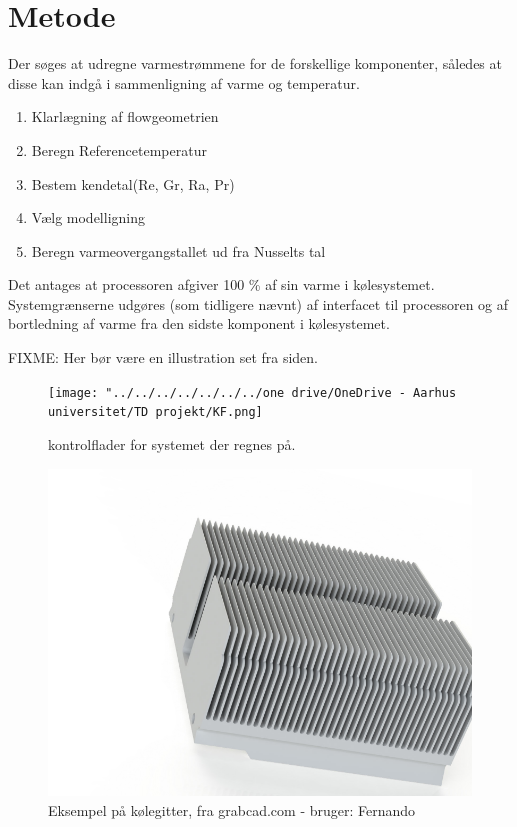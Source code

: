 \section{Metode}

Der søges at udregne varmestrømmene for de forskellige komponenter, således at disse kan indgå i sammenligning af varme og temperatur.

\begin{enumerate}
	\item Klarlægning af flowgeometrien
	\item Beregn Referencetemperatur
	\item Bestem kendetal(Re, Gr, Ra, Pr)
	\item Vælg modelligning
	\item Beregn varmeovergangstallet ud fra Nusselts tal
\end{enumerate}

Det antages at processoren afgiver 100 \% af sin varme i kølesystemet.
Systemgrænserne udgøres (som tidligere nævnt) af interfacet til processoren og af bortledning af varme fra den sidste komponent i kølesystemet.

FIXME: Her bør være en illustration set fra siden.
\begin{figure}
	\centering
	\texttt{[image: "../../../../../../../one drive/OneDrive - Aarhus universitet/TD projekt/KF.png]}
	\caption{kontrolflader for systemet der regnes på.}
	\label{fig:kf}
\end{figure}

\begin{figure}
	\centering
	\includegraphics[width=0.7\linewidth]{billeder/heatsink1}
	\caption{Eksempel på kølegitter, fra grabcad.com - bruger: Fernando}
	\label{fig:heatsink1}
\end{figure}


